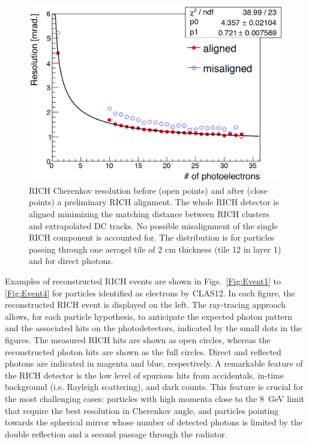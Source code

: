 \documentclass[5p,times,twocolumn]{elsarticle}
\begin{document}
\begin{figure}[t]
\begin{center}
\includegraphics[width=1.0\columnwidth]{Tile12_rms_plot2.png}
\end{center}
\caption{RICH Cherenkov resolution before (open points) and after (close points) a preliminary RICH alignment. The whole RICH
  detector is aligned minimizing the matching distance between RICH clusters and extrapolated DC tracks. No
  possible misalignment of the single RICH component is accounted for. The distribution is for particles passing through
  one aerogel tile of 2 cm thickness (tile 12 in layer 1) and for direct photons.}
\label{Fig:Align}
\end{figure}

Examples of reconstructed RICH events are shown in Figs.~\ref{Fig:Event1} to \ref{Fig:Event4} for particles
identified as electrons by CLAS12. In each figure, the reconstructed RICH event is displayed on the left. The
ray-tracing approach allows, for each particle hypothesis, to anticipate the expected photon pattern and the associated
hits on the photodetectors, indicated by the small dots in the figures.
The measured RICH hits are shown as open circles, whereas the reconstructed photon hits are shown as the full
circles. Direct and reflected photons are indicated in magenta and blue, respectively. A remarkable feature of the
RICH detector is the low level of spurious hits from accidentals, in-time background (i.e. Rayleigh scattering), and
dark counts. This feature is crucial for the most challenging cases: particles with high momenta close to the 8~GeV
limit that require the best resolution in Cherenkov angle, and particles pointing towards the spherical mirror whose
number of detected photons is limited by the double reflection and a second passage through the radiator. 
\end{document}
